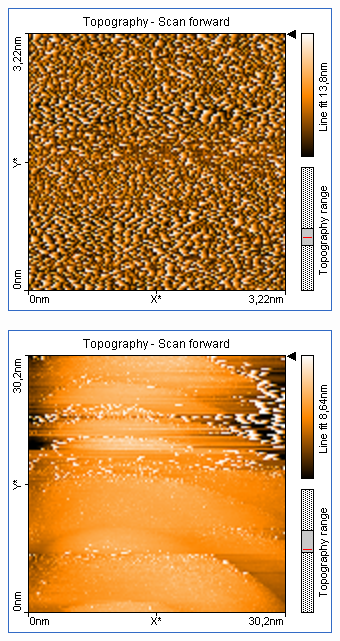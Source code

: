 \begin{figure}
    \begin{subfigure}[b]{\picwidth}
        \includegraphics[width=\textwidth]{data/Gold/pic_01_01_3nm}
        \caption{}
        \label{fig:gold_01_01}
    \end{subfigure}\qquad
    \begin{subfigure}[b]{\picwidth}
        \includegraphics[width=\textwidth]{data/Gold/pic_01_03_30nm}

\end{subfigure}
\end{figure}
